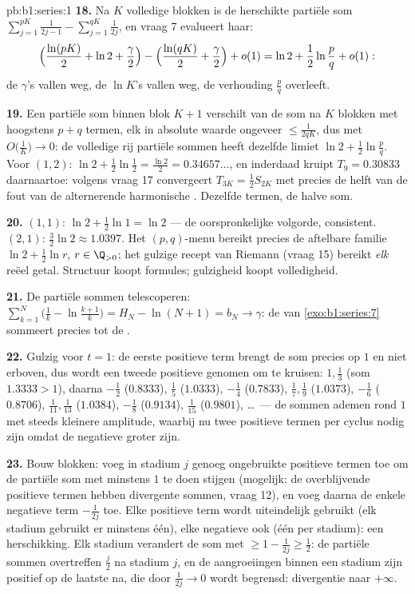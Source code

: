 \begin{solution}{pb:b1:series:1}
\textbf{18.} Na $K$ volledige blokken is de herschikte partiële
som $\sum_{j=1}^{pK}\frac{1}{2j-1} -
\sum_{j=1}^{qK}\frac{1}{2j}$, en vraag 7 evalueert haar:
\[
\Bigl(\frac{\ln(pK)}{2} + \ln 2 + \frac\gamma2\Bigr)
- \Bigl(\frac{\ln(qK)}{2} + \frac\gamma2\Bigr) + o(1)
= \ln 2 + \frac12\ln\frac pq + o(1) :
\]
de $\gamma$'s vallen weg, de $\ln K$'s vallen weg, de verhouding
$\frac pq$ overleeft.

\textbf{19.} Een partiële som binnen blok $K + 1$ verschilt van
de som na $K$ blokken met hoogstens $p + q$ termen, elk in
absolute waarde ongeveer $\leq \frac{1}{2qK}$, dus met
$O\bigl(\frac1K\bigr) \to 0$: de volledige rij partiële sommen
heeft dezelfde limiet $\ln 2 + \frac12\ln\frac pq$. Voor $(1,
2)$: $\ln 2 + \frac12\ln\frac12 = \frac{\ln 2}{2} =
0.34657\dots$, en inderdaad kruipt $T_9 = 0.30833$ daarnaartoe:
volgens vraag 17 convergeert $T_{3K} = \frac12 S_{2K}$ met
precies de helft van de fout van de alternerende harmonische
. Dezelfde termen, de halve som.

\textbf{20.} $(1,1)$: $\ln 2 + \frac12\ln 1 = \ln 2$ --- de
oorspronkelijke volgorde, consistent. $(2,1)$: $\frac32\ln 2
\approx 1.0397$. Het $(p,q)$-menu bereikt precies de aftelbare
 familie $\ln 2 + \frac12\ln r$, $r \in \Q_{>0}$; het
gulzige recept van Riemann (vraag 15) bereikt \emph{elk} reëel
getal. Structuur koopt formules; gulzigheid koopt volledigheid.

\textbf{21.} De partiële sommen telescoperen: $\sum_{k=1}^{N}
\bigl(\frac1k - \ln\frac{k+1}{k}\bigr) = H_N - \ln(N+1) = b_N
\to \gamma$: de  van \cref{exo:b1:series:7} sommeert precies
tot de .

\textbf{22.} Gulzig voor $t = 1$: de eerste positieve term brengt
de som precies op $1$ en niet erboven, dus wordt een tweede
positieve genomen om te kruisen: $1, \frac13$ (som $1.3333 > 1$),
daarna $-\frac12$ ($0.8333$), $\frac15$ ($1.0333$), $-\frac14$
($0.7833$), $\frac17, \frac19$ ($1.0373$), $-\frac16$
($0.8706$), $\frac1{11}, \frac1{13}$ ($1.0384$), $-\frac18$
($0.9134$), $\frac1{15}$ ($0.9801$), \dots\ --- de sommen ademen
rond $1$ met steeds kleinere amplitude, waarbij nu twee positieve
termen per cyclus nodig zijn omdat de negatieve groter zijn.

\textbf{23.} Bouw blokken: voeg in stadium $j$ genoeg ongebruikte
positieve termen toe om de partiële som met minstens $1$ te doen
stijgen (mogelijk: de overblijvende positieve termen hebben
divergente sommen, vraag 12), en voeg daarna de enkele negatieve
term $-\frac{1}{2j}$ toe. Elke positieve term wordt uiteindelijk
gebruikt (elk stadium gebruikt er minstens één), elke negatieve
ook (één per stadium): een herschikking. Elk stadium verandert de
som met $\geq 1 - \frac{1}{2j} \geq \frac12$: de partiële sommen
overtreffen $\frac{j}{2}$ na stadium $j$, en de aangroeiingen
binnen een stadium zijn positief op de laatste na, die door
$\frac{1}{2j} \to 0$ wordt begrensd: divergentie naar $+\infty$.


\end{solution}
